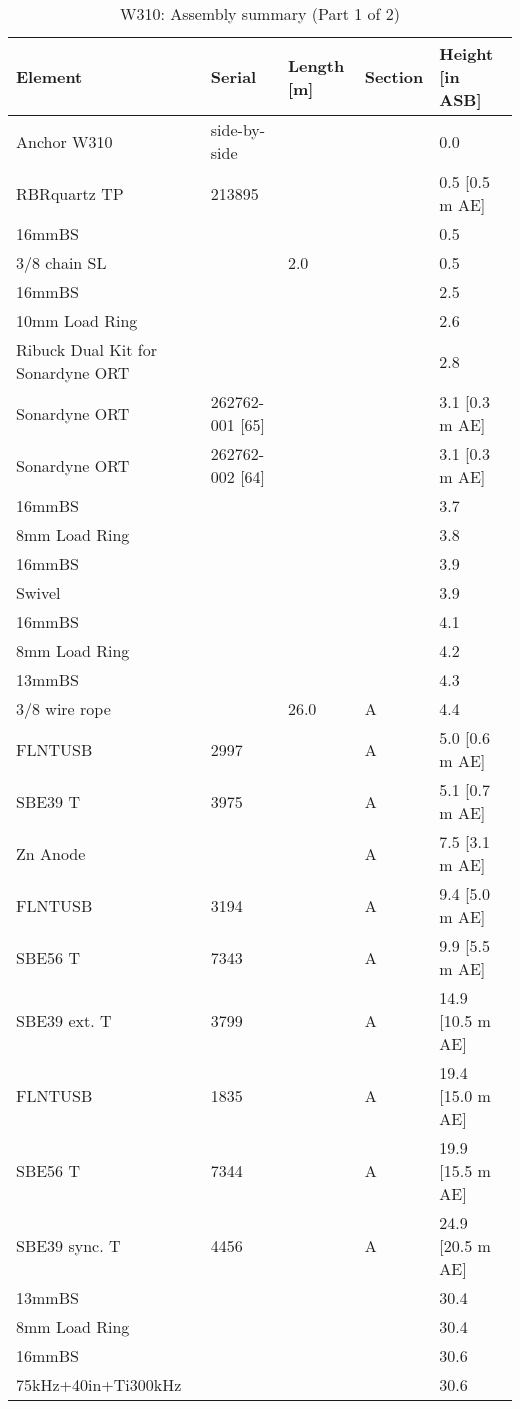 \documentclass{article}
\begin{document}
\begin{table}[!htbp]
\centering
\caption{W310: Assembly summary (Part 1 of 2)}
\begin{tabular}{lllll}
\toprule
Element & Serial & Length [m] & Section & Height [in ASB] \\
\midrule
Anchor W310 & side-by-side &  &  & 0.0 \\
RBRquartz TP & 213895 &  &  & 0.5 [0.5 m AE] \\
16mmBS &  &  &  & 0.5 \\
3/8 chain SL &  & 2.0 &  & 0.5 \\
16mmBS &  &  &  & 2.5 \\
10mm Load Ring &  &  &  & 2.6 \\
Ribuck Dual Kit for Sonardyne ORT &  &  &  & 2.8 \\
Sonardyne ORT & 262762-001 [65] &  &  & 3.1 [0.3 m AE] \\
Sonardyne ORT & 262762-002 [64] &  &  & 3.1 [0.3 m AE] \\
16mmBS &  &  &  & 3.7 \\
8mm Load Ring &  &  &  & 3.8 \\
16mmBS &  &  &  & 3.9 \\
Swivel &  &  &  & 3.9 \\
16mmBS &  &  &  & 4.1 \\
8mm Load Ring &  &  &  & 4.2 \\
13mmBS &  &  &  & 4.3 \\
3/8 wire rope &  & 26.0 & A & 4.4 \\
FLNTUSB & 2997 &  & A & 5.0 [0.6 m AE] \\
SBE39 T & 3975 &  & A & 5.1 [0.7 m AE] \\
Zn Anode &  &  & A & 7.5 [3.1 m AE] \\
FLNTUSB & 3194 &  & A & 9.4 [5.0 m AE] \\
SBE56 T & 7343 &  & A & 9.9 [5.5 m AE] \\
SBE39 ext. T & 3799 &  & A & 14.9 [10.5 m AE] \\
FLNTUSB & 1835 &  & A & 19.4 [15.0 m AE] \\
SBE56 T & 7344 &  & A & 19.9 [15.5 m AE] \\
SBE39 sync. T & 4456 &  & A & 24.9 [20.5 m AE] \\
13mmBS &  &  &  & 30.4 \\
8mm Load Ring &  &  &  & 30.4 \\
16mmBS &  &  &  & 30.6 \\
75kHz+40in+Ti300kHz &  &  &  & 30.6 \\

\end{tabular}
\end{table}
\end{document}
